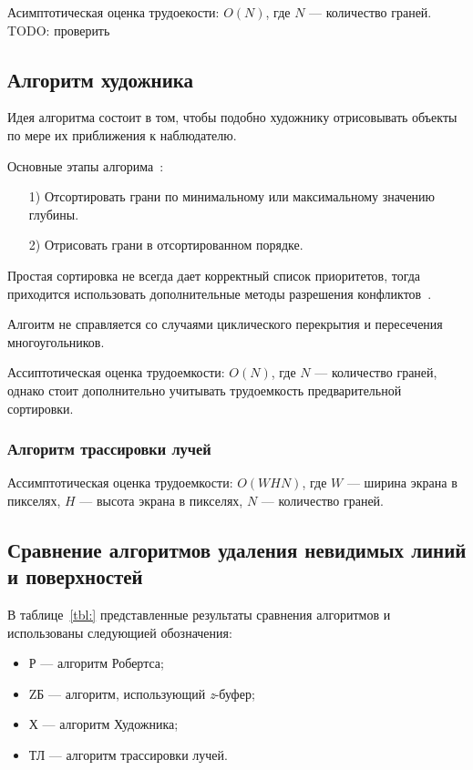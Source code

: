    
   Асимптотическая оценка трудоекости: $O(N)$, где $N$ --- количество граней. TODO: проверить
      
   \subsection{Алгоритм художника}
   
   Идея алгоритма состоит в том, чтобы подобно художнику отрисовывать объекты по мере их приближения к наблюдателю.
   
   Основные этапы алгорима~\cite{rogers}:
   \begin{enumerate}
   	\item[1)] Отсортировать грани по минимальному или максимальному значению глубины.
   	\item[2)] Отрисовать грани в отсортированном порядке.
   \end{enumerate}
   
   Простая сортировка не всегда дает корректный список приоритетов, тогда приходится использовать дополнительные методы разрешения конфликтов~\cite{rogers}. 
   
   Алгоитм не справляется со случаями циклического перекрытия и пересечения многоугольников.
   
   Ассиптотическая оценка трудоемкости: $O(N)$, где $N$ --- количество граней, однако стоит дополнительно учитывать трудоемкость предварительной сортировки.
     
    \subsubsection{Алгоритм трассировки лучей}
    
    Ассимптотическая оценка трудоемкости: $O(WHN)$, где $W$ --- ширина экрана в пикселях, $H$ --- высота экрана в пикселях, $N$ --- количество граней.   
    
    \subsection{Сравнение алгоритмов удаления невидимых линий и поверхностей}
    
    В таблице~\ref{tbl:} представленные результаты сравнения алгоритмов и использованы следующией обозначения:
    
    \begin{itemize}
    	\item Р --- алгоритм Робертса;
    	\item ZБ --- алгоритм, использующий \textit{z}-буфер;
    	\item Х --- алгоритм Художника;
    	\item ТЛ --- алгоритм трассировки лучей.
  	\end{itemize}
  	
